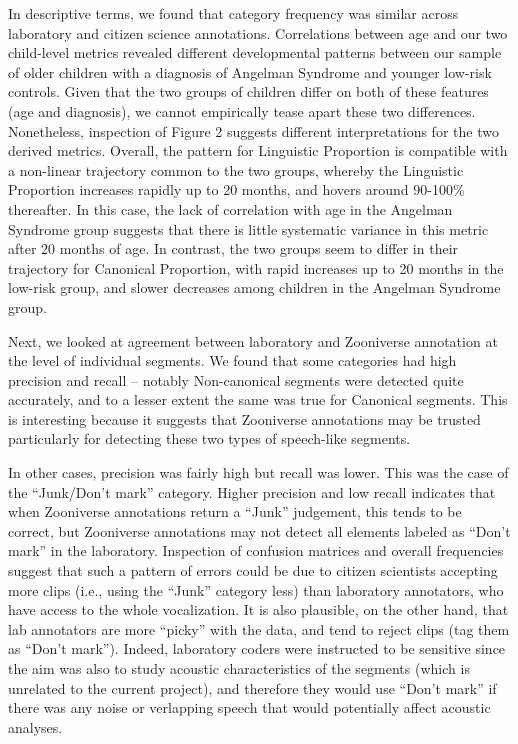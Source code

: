 \documentclass[english,,man,floatsintext]{apa6}
\begin{document}
In descriptive terms, we found that category frequency was similar across laboratory and citizen science annotations. Correlations between age and our two child-level metrics revealed different developmental patterns between our sample of older children with a diagnosis of Angelman Syndrome and younger low-risk controls. Given that the two groups of children differ on both of these features (age and diagnosis), we cannot empirically tease apart these two differences. Nonetheless, inspection of Figure 2 suggests different interpretations for the two derived metrics. Overall, the pattern for Linguistic Proportion is compatible with a non-linear trajectory common to the two groups, whereby the Linguistic Proportion increases rapidly up to 20 months, and hovers around 90-100\% thereafter. In this case, the lack of correlation with age in the Angelman Syndrome group suggests that there is little systematic variance in this metric after 20 months of age. In contrast, the two groups seem to differ in their trajectory for Canonical Proportion, with rapid increases up to 20 months in the low-risk group, and slower decreases among children in the Angelman Syndrome group.

Next, we looked at agreement between laboratory and Zooniverse annotation at the level of individual segments. We found that some categories had high precision and recall -- notably Non-canonical segments were detected quite accurately, and to a lesser extent the same was true for Canonical segments. This is interesting because it suggests that Zooniverse annotations may be trusted particularly for detecting these two types of speech-like segments.

In other cases, precision was fairly high but recall was lower. This was the case of the \enquote{Junk/Don't mark} category. Higher precision and low recall indicates that when Zooniverse annotations return a \enquote{Junk} judgement, this tends to be correct, but Zooniverse annotations may not detect all elements labeled as \enquote{Don't mark} in the laboratory. Inspection of confusion matrices and overall frequencies suggest that such a pattern of errors could be due to citizen scientists accepting more clips (i.e., using the \enquote{Junk} category less) than laboratory annotators, who have access to the whole vocalization. It is also plausible, on the other hand, that lab annotators are more \enquote{picky} with the data, and tend to reject clips (tag them as \enquote{Don't mark}). Indeed, laboratory coders were instructed to be sensitive since the aim was also to study acoustic characteristics of the segments (which is unrelated to the current project), and therefore they would use \enquote{Don't mark} if there was any noise or verlapping speech that would potentially affect acoustic analyses.
\end{document}
